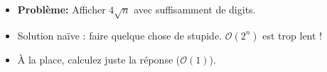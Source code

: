 \begin{frame}
    \frametitle{\problemtitle}
    \begin{itemize}
        \item<+-> \textbf{Problème:} Afficher $4\sqrt{n}$ avec suffisamment de digits.
        \item<+-> Solution na\"ive : faire quelque chose de stupide. $\mathcal O(2^n)$ est trop lent !
        \item<+-> À la place, calculez juste la réponse ($\mathcal O(1)$).
    \end{itemize}
\end{frame}
